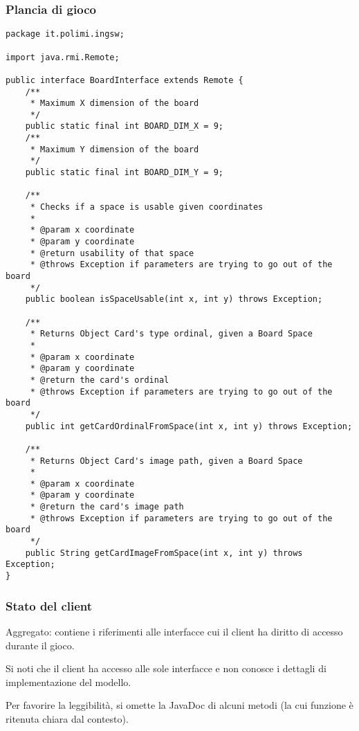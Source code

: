\documentclass[a4paper,11pt]{article} %
\begin{document}
    \subsubsection{Plancia di gioco}

    \begin{verbatim}
package it.polimi.ingsw;

import java.rmi.Remote;

public interface BoardInterface extends Remote {
    /**
     * Maximum X dimension of the board
     */
    public static final int BOARD_DIM_X = 9;
    /**
     * Maximum Y dimension of the board
     */
    public static final int BOARD_DIM_Y = 9;

    /**
     * Checks if a space is usable given coordinates
     *
     * @param x coordinate
     * @param y coordinate
     * @return usability of that space
     * @throws Exception if parameters are trying to go out of the board
     */
    public boolean isSpaceUsable(int x, int y) throws Exception;

    /**
     * Returns Object Card's type ordinal, given a Board Space
     *
     * @param x coordinate
     * @param y coordinate
     * @return the card's ordinal
     * @throws Exception if parameters are trying to go out of the board
     */
    public int getCardOrdinalFromSpace(int x, int y) throws Exception;

    /**
     * Returns Object Card's image path, given a Board Space
     *
     * @param x coordinate
     * @param y coordinate
     * @return the card's image path
     * @throws Exception if parameters are trying to go out of the board
     */
    public String getCardImageFromSpace(int x, int y) throws Exception;
}
    \end{verbatim}

    \subsubsection{Stato del client}
    Aggregato: contiene i riferimenti alle interfacce cui il client ha diritto di accesso durante il gioco.

    Si noti che il client ha accesso alle sole interfacce e non conosce i dettagli di implementazione del modello.

    \smallskip

    Per favorire la leggibilità, si omette la JavaDoc di alcuni metodi (la cui funzione è ritenuta chiara dal contesto).
\end{document}

